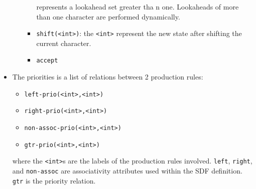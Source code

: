 \documentclass{article}
\newcommand{\code}[1]{\texttt{#1}}
\begin{document}
\begin{itemize}
\begin{itemize}
\begin{itemize}
      represents a lookahead set greater tha n one. Lookaheads of more than one
      character are performed dynamically. 
      \item \code{shift(<int>)}: the \code{<int>} represent the new state after
      shifting the current character.
      \item \code{accept}
    \end{itemize} 
    \end{itemize} 
	\item The priorities is a list of relations between 2 production rules: 
    \begin{itemize}
      \item \code{left-prio(<int>,<int>)}
      \item \code{right-prio(<int>,<int>)}
      \item \code{non-assoc-prio(<int>,<int>)}
      \item \code{gtr-prio(<int>,<int>)}
    \end{itemize}
	 where the
      \code{<int>}s are the labels of the production rules involved.
      \code{left}, \code{right}, and \code{non-assoc} are associativity
      attributes used within the SDF definition. \code{gtr} is the priority
      relation.
    \end{itemize} 
\end{document}

